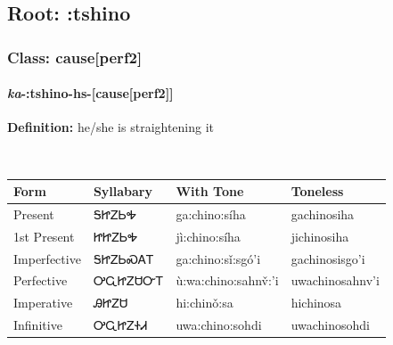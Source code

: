 \needspace{4in}
\subsection*{Root: :tshino}
\nopagebreak
{}
\needspace{3in}
\subsubsection*{Class: cause[perf2]}
\nopagebreak
\needspace{2in}
\paragraph*{\textit{ka}{-}\textbf{:tshino}{-}hs{-}[cause[perf2]]}
\nopagebreak
\textbf{Definition: } he/she is straightening it
\\[0.5em]
\begin{tabularx}{\textwidth}{l X X X}%
\toprule%
\textbf{Form}&\textbf{Syllabary}&\textbf{With Tone}&\textbf{Toneless}\\%
\midrule%
Present&ᎦᏥᏃᏏᎭ&ga:chino:síha&gachinosiha\\%
1st Present&ᏥᏥᏃᏏᎭ&jì:chino:síha&jichinosiha\\%
Imperfective&ᎦᏥᏃᏏᏍᎪᎢ&ga:chino:sǐ:sgó’i&gachinosisgo’i\\%
Perfective&ᎤᏩᏥᏃᏌᏅᎢ&ù:wa:chino:sahnv̌:’i&uwachinosahnv’i\\%
Imperative&ᎯᏥᏃᏌ&hi:chinǒ:sa&hichinosa\\%
Infinitive&ᎤᏩᏥᏃᏐᏗ&uwa:chino:sohdi&uwachinosohdi\\%
\bottomrule%
\end{tabularx}
\\[1em]